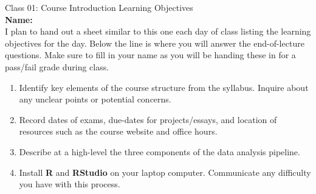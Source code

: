 \documentclass[11pt]{article}
\date{2018-07-01}                                           %
\begin{document}
{\Large \textcolor{oiB}{
Class 01: Course Introduction
\hfill Learning Objectives}} \\

\textbf{Name:} \underline{\hspace{6cm}} \\

I plan to hand out a sheet similar to this one each day of class listing the
learning objectives for the day. Below the line is where you will answer the
end-of-lecture questions. Make sure to fill in your name as you will be
handing these in for a pass/fail grade during class.

\vspace{0.2cm}

\begin{enumerate}
\renewcommand\labelenumi{\textcolor{light}{\textbf{LO \theenumi.}}}

\item Identify key elements of the course structure from the syllabus. Inquire
about any unclear points or potential concerns.

\item Record dates of exams, due-dates for projects/essays, and location of
resources such as the course website and office hours.

\item Describe at a high-level the three components of the data analysis
pipeline.

\item Install \textbf{R} and \textbf{RStudio} on your laptop computer.
Communicate any difficulty you have with this process.

\end{enumerate}

\noindent\makebox[\linewidth]{\rule{1.1\textwidth}{0.4pt}}
\end{document}
